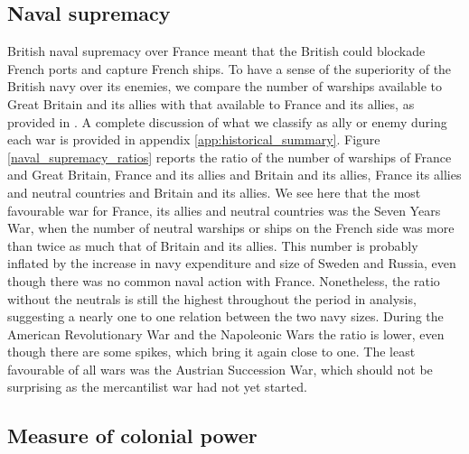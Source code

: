 \documentclass[12pt,a4paper,notitlepage,english]{article}
\begin{document}
\subsection{Naval supremacy}
British naval supremacy over France meant that the British could blockade French ports and capture French ships.
To have a sense of the superiority of the British navy over its enemies, we compare the number of warships available to Great Britain and its allies with that available to France and its allies, as provided in \cite{Modelski1988}. 
A complete discussion of what we classify as ally or enemy during each war is provided in appendix \ref{app:historical_summary}. 
Figure \ref{naval_supremacy_ratios} reports the ratio of the number of warships of France and Great Britain, France and its allies and Britain and its allies, France its allies and neutral countries and Britain and its allies.
We see here that the most favourable war for France, its allies and neutral countries was the Seven Years War, when the number of neutral warships or ships on the French side was more than twice as much that of Britain and its allies. This number is probably inflated by the increase in navy expenditure and size of Sweden and Russia,  even though there was no common naval action with France. Nonetheless, the ratio without the neutrals is still the highest throughout the period in analysis, suggesting a nearly one to one relation between the two navy sizes. 
During the American Revolutionary War and the Napoleonic Wars the ratio is lower, even though there are some spikes, which bring it again close to one. 
The least favourable of all wars was the Austrian Succession War, which should not be surprising as the mercantilist war had not yet started. 



\subsection{Measure of colonial power}
\end{document}
